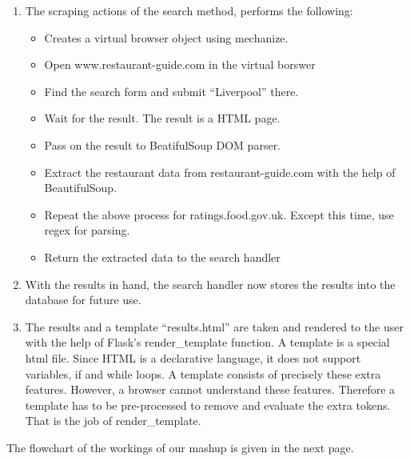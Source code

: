 \begin{enumerate}
\item The scraping actions of the search method, performs the following:
  \begin{itemize}
  \item Creates a virtual browser object using mechanize.
  \item Open www.restaurant-guide.com in the virtual borswer
  \item Find the search form and submit “Liverpool” there.
  \item Wait for the result. The result is a HTML page.
  \item Pass on the result to BeatifulSoup DOM parser.
  \item Extract the restaurant data from restaurant-guide.com with the help of BeautifulSoup.
  \item Repeat the above process for ratings.food.gov.uk. Except this time, use regex for parsing.
  \item Return the extracted data to the search handler
  \end{itemize}
\item With the results in hand, the search handler now stores the results into the database for future use.
\item The results and a template “results.html” are taken and rendered to the user with the help of Flask's render\_template function. A template is a special html file. Since HTML is a declarative language, it does not support variables, if and while loops. A template consists of precisely these extra features. However, a browser cannot understand these features. Therefore a template has to be pre-processed to remove and evaluate the extra tokens. That is the job of render\_template.
  
\end{enumerate}
The flowchart of the workings of our mashup is given in the next page.

